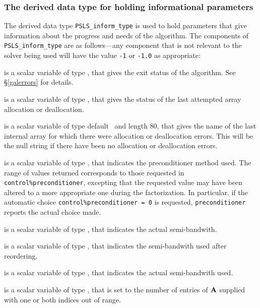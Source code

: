 \documentclass{galahad}
\newcommand{\packagename}{PSLS}
\begin{document}

\subsubsection{The derived data type for holding informational
 parameters}\label{typeinform}
The derived data type
{\tt \packagename\_inform\_type}
is used to hold parameters that give information about the progress and needs
of the algorithm. The components of
{\tt \packagename\_inform\_type}
are as follows---any component that is not relevant to the solver being used
will have the value {\tt -1} or {\tt -1.0} as appropriate:

\begin{description}

 is a scalar variable of type \integer, that gives the
exit status of the algorithm.
See \S\ref{galerrors}
for details.

 is a scalar variable of type \integer, that gives
the status of the last attempted array allocation or deallocation.

 is a scalar variable of type default \character\
and length 80, that  gives the name of the last internal array
for which there were allocation or deallocation errors.
This will be the null string if there have been no
allocation or deallocation errors.

 is a scalar variable of type \integer,
that indicates the preconditioner method used. The range of values returned
corresponds to those requested in {\tt control\%preconditioner},
excepting that the requested value may have been altered to a more
appropriate one during the factorization. In particular, if the automatic
choice {\tt control\%preconditioner = 0} is requested,
{\tt preconditioner} reports the actual choice made.

 is a scalar variable of type \integer,
that indicates the actual semi-bandwith.

 is a scalar variable of type \integer,
that indicates the semi-bandwith used after reordering.

 is a scalar variable of type \integer,
that indicates the actual semi-bandwith used.

 is a scalar variable of type \integer,
that is set to the number of
entries of ${\mathbf{A}}$ supplied with one or both indices out of range.


\end{description}
\end{document}
